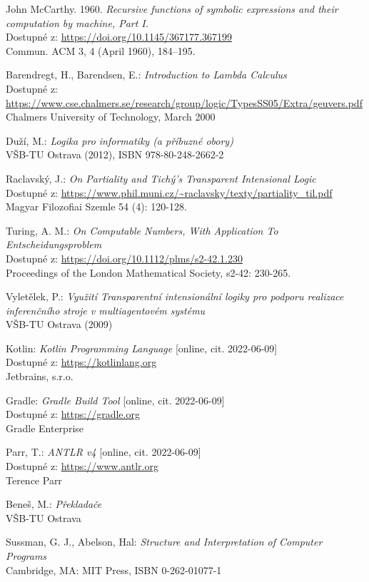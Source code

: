 \documentclass[czech,master]{diploma}
\begin{document}
\begin{thebibliography}{50}
John McCarthy. 1960. \textit{Recursive functions of symbolic expressions and their computation by machine, Part I.}\\
Dostupné z: \url{https://doi.org/10.1145/367177.367199}\\
Commun. ACM 3, 4 (April 1960), 184–195.

Barendregt, H., Barendsen, E.: \textit{Introduction to Lambda Calculus}\\
Dostupné z: \url{https://www.cse.chalmers.se/research/group/logic/TypesSS05/Extra/geuvers.pdf}\\
Chalmers University of Technology, March 2000

Duží, M.: \textit{Logika pro informatiky (a příbuzné obory)} \\
VŠB-TU Ostrava (2012), ISBN 978-80-248-2662-2

Raclavský, J.: \textit{On Partiality and Tichý's Transparent Intensional Logic} \\
Dostupné z: \url{https://www.phil.muni.cz/~raclavsky/texty/partiality_til.pdf} \\
Magyar Filozofiai Szemle 54 (4): 120-128.

Turing, A. M.: \textit{On Computable Numbers, With Application To Entscheidungsproblem} \\
Dostupné z: \url{https://doi.org/10.1112/plms/s2-42.1.230}\\
Proceedings of the London Mathematical Society, s2-42: 230-265.

Vyletělek, P.: \textit{Využití Transparentní intensionální logiky pro podporu realizace inferenčního stroje v multiagentovém systému} \\
VŠB-TU Ostrava (2009)

Kotlin: \textit{Kotlin Programming Language} [online, cit. 2022-06-09] \\
Dostupné z: \url{https://kotlinlang.org} \\
Jetbrains, s.r.o.

Gradle: \textit{Gradle Build Tool} [online, cit. 2022-06-09] \\
Dostupné z: \url{https://gradle.org} \\
Gradle Enterprise

Parr, T.: \textit{ANTLR v4} [online, cit. 2022-06-09] \\
Dostupné z: \url{https://www.antlr.org} \\
Terence Parr

Beneš, M.: \textit{Překladače} \\
VŠB-TU Ostrava

Sussman, G. J., Abelson, Hal: \textit{Structure and Interpretation of Computer Programs} \\
Cambridge, MA: MIT Press, ISBN 0-262-01077-1
\end{thebibliography}

\appendix


\end{document}

